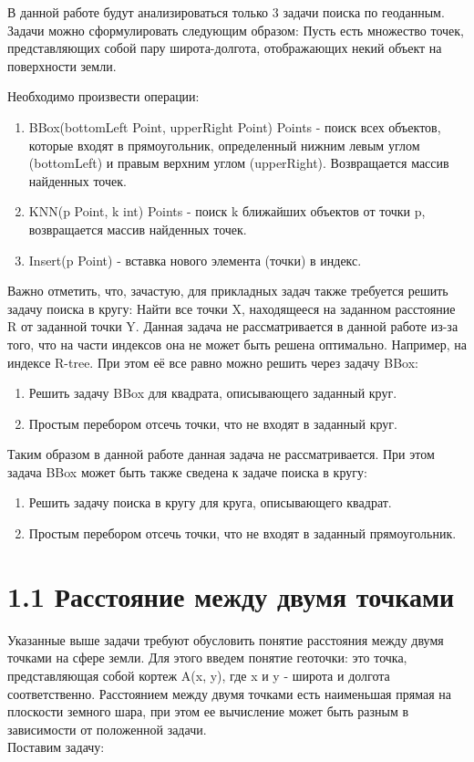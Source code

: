 \label{cha:analysis}

В данной работе будут анализироваться только 3 задачи поиска по геоданным. Задачи можно сформулировать следующим образом:
Пусть есть множество точек, представляющих собой пару широта-долгота, отображающих некий объект на поверхности земли. 

Необходимо произвести операции:
\begin{enumerate}
    \item BBox(bottomLeft Point, upperRight Point) Points - поиск всех объектов, которые входят в прямоугольник, определенный нижним левым углом (bottomLeft) и правым верхним углом (upperRight). Возвращается массив найденных точек.
    \item KNN(p Point, k int) Points - поиск k ближайших объектов от точки p, возвращается массив найденных точек.
    \item Insert(p Point) - вставка нового элемента (точки) в индекс. 
\end{enumerate}
Важно отметить, что, зачастую, для прикладных задач также требуется решить задачу поиска в кругу: Найти все точки X, находящееся на заданном расстояние R от заданной точки Y. Данная задача не рассматривается в данной работе из-за того, что на части индексов она не может быть решена оптимально. Например, на индексе R-tree. При этом её все равно можно решить через задачу BBox: 
\begin{enumerate}
    \item Решить задачу BBox для квадрата, описывающего заданный круг. 
    \item Простым перебором отсечь точки, что не входят в заданный круг.
\end{enumerate}
Таким образом в данной работе данная задача не рассматривается. При этом задача BBox может быть также сведена к задаче поиска в кругу:
\begin{enumerate}
    \item Решить задачу поиска в кругу для круга, описывающего квадрат.
    \item Простым перебором отсечь точки, что не входят в заданный прямоугольник.
\end{enumerate}

\section{1.1 Расстояние между двумя точками}
Указанные выше задачи требуют обусловить понятие расстояния между двумя точками на сфере земли. Для этого введем понятие геоточки: это точка, представляющая собой кортеж A(x, y), где x и y - широта и долгота соответственно. 
Расстоянием между двумя точками есть наименьшая прямая на плоскости земного шара, при этом ее вычисление может быть разным в зависимости от положенной задачи. \\
Поставим задачу:

